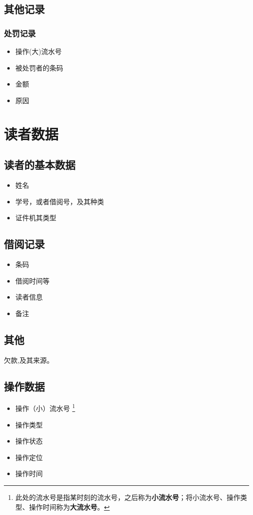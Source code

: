 \documentclass[UTF8]{report}
\begin{document}
    \section{其他记录}
    \subsection{处罚记录}
    \begin{itemize}
        \item 操作(大)流水号
        \item 被处罚者的条码
        \item 金额
        \item 原因
    \end{itemize}
    \chapter{读者数据}
    \section{读者的基本数据}
    \begin{itemize}
    	\item 姓名
    	\item 学号，或者借阅号，及其种类
    	\item 证件机其类型
    \end{itemize}
    \section{借阅记录}
    \begin{itemize}
    	\item 条码
    	\item 借阅时间等
    	\item 读者信息
    	\item 备注
    \end{itemize}
    \section{其他}
    欠款,及其来源。
    \section{操作数据}
    \begin{itemize}
        \item 操作（小）流水号 \label{流水号}
        \footnote{\label{流水号:footnote}
            此处的流水号是指某时刻的流水号，之后称为\textbf{小流水号}；将小流水号、操作类型、操作时间称为\textbf{大流水号}。
            }
        \item 操作类型
        \item 操作状态
        \item 操作定位
        \item 操作时间
    \end{itemize}
    \begin{appendices}
        
    \end{appendices}
\end{document}
